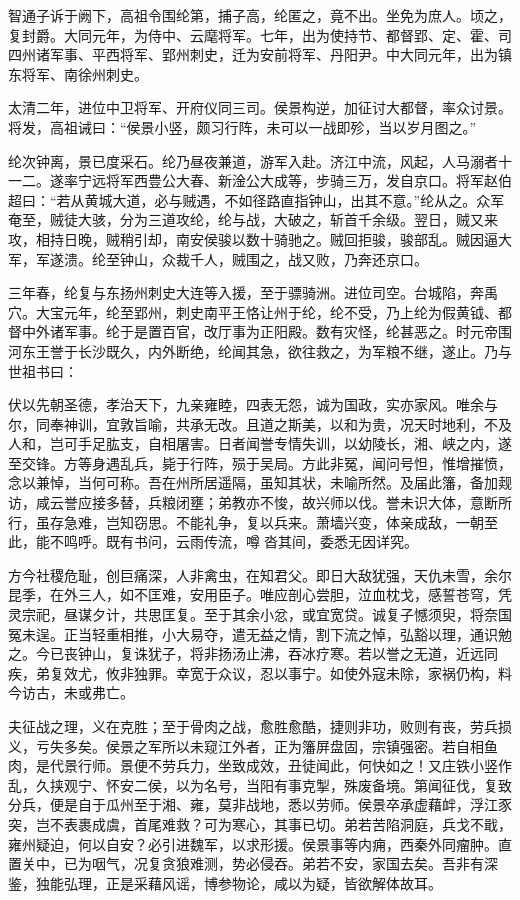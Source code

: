 \documentclass[12pt,UTF8]{ctexbook}
\begin{document}
智通子诉于阙下，高祖令围纶第，捕子高，纶匿之，竟不出。坐免为庶人。顷之，复封爵。大同元年，为侍中、云麾将军。七年，出为使持节、都督郢、定、霍、司四州诸军事、平西将军、郢州刺史，迁为安前将军、丹阳尹。中大同元年，出为镇东将军、南徐州刺史。

太清二年，进位中卫将军、开府仪同三司。侯景构逆，加征讨大都督，率众讨景。将发，高祖诫曰：“侯景小竖，颇习行阵，未可以一战即殄，当以岁月图之。”

纶次钟离，景已度采石。纶乃昼夜兼道，游军入赴。济江中流，风起，人马溺者十一二。遂率宁远将军西豊公大春、新淦公大成等，步骑三万，发自京口。将军赵伯超曰：“若从黄城大道，必与贼遇，不如径路直指钟山，出其不意。”纶从之。众军奄至，贼徒大骇，分为三道攻纶，纶与战，大破之，斩首千余级。翌日，贼又来攻，相持日晚，贼稍引却，南安侯骏以数十骑驰之。贼回拒骏，骏部乱。贼因逼大军，军遂溃。纶至钟山，众裁千人，贼围之，战又败，乃奔还京口。

三年春，纶复与东扬州刺史大连等入援，至于骠骑洲。进位司空。台城陷，奔禹穴。大宝元年，纶至郢州，刺史南平王恪让州于纶，纶不受，乃上纶为假黄钺、都督中外诸军事。纶于是置百官，改厅事为正阳殿。数有灾怪，纶甚恶之。时元帝围河东王誉于长沙既久，内外断绝，纶闻其急，欲往救之，为军粮不继，遂止。乃与世祖书曰：

伏以先朝圣德，孝治天下，九亲雍睦，四表无怨，诚为国政，实亦家风。唯余与尔，同奉神训，宜敦旨喻，共承无改。且道之斯美，以和为贵，况天时地利，不及人和，岂可手足肱支，自相屠害。日者闻誉专情失训，以幼陵长，湘、峡之内，遂至交锋。方等身遇乱兵，毙于行阵，殒于吴局。方此非冤，闻问号怛，惟增摧愤，念以兼悼，当何可称。吾在州所居遥隔，虽知其状，未喻所然。及届此籓，备加觌访，咸云誉应接多替，兵粮闭壅；弟教亦不悛，故兴师以伐。誉未识大体，意断所行，虽存急难，岂知窃思。不能礼争，复以兵来。萧墙兴变，体亲成敌，一朝至此，能不鸣呼。既有书问，云雨传流，噂沓其间，委悉无因详究。

方今社稷危耻，创巨痛深，人非禽虫，在知君父。即日大敌犹强，天仇未雪，余尔昆季，在外三人，如不匡难，安用臣子。唯应剖心尝胆，泣血枕戈，感誓苍穹，凭灵宗祀，昼谋夕计，共思匡复。至于其余小忿，或宜宽贷。诚复子憾须臾，将奈国冤未逞。正当轻重相推，小大易夺，遣无益之情，割下流之悼，弘豁以理，通识勉之。今已丧钟山，复诛犹子，将非扬汤止沸，吞冰疗寒。若以誉之无道，近远同疾，弟复效尤，攸非独罪。幸宽于众议，忍以事宁。如使外寇未除，家祸仍构，料今访古，未或弗亡。

夫征战之理，义在克胜；至于骨肉之战，愈胜愈酷，捷则非功，败则有丧，劳兵损义，亏失多矣。侯景之军所以未窥江外者，正为籓屏盘固，宗镇强密。若自相鱼肉，是代景行师。景便不劳兵力，坐致成效，丑徒闻此，何快如之！又庄铁小竖作乱，久挟观宁、怀安二侯，以为名号，当阳有事克掣，殊废备境。第闻征伐，复致分兵，便是自于瓜州至于湘、雍，莫非战地，悉以劳师。侯景卒承虚藉衅，浮江豕突，岂不表裹成虞，首尾难救？可为寒心，其事已切。弟若苦陷洞庭，兵戈不戢，雍州疑迫，何以自安？必引进魏军，以求形援。侯景事等内痈，西秦外同瘤肿。直置关中，已为咽气，况复贪狼难测，势必侵吞。弟若不安，家国去矣。吾非有深鉴，独能弘理，正是采藉风谣，博参物论，咸以为疑，皆欲解体故耳。
\end{document}
